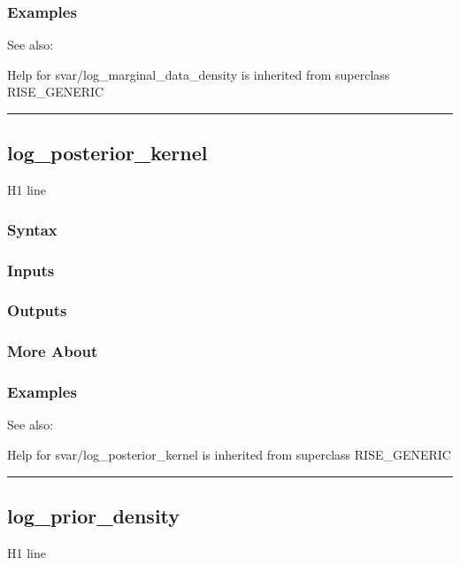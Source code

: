 \documentclass[letterpaper,10pt,english]{sphinxmanual}
\begin{document}
\subsubsection{Examples}
\label{classes/models/@svar/svar:id51}
See also:

Help for svar/log\_marginal\_data\_density is inherited from superclass RISE\_GENERIC


\bigskip\hrule{}\bigskip



\subsection{log\_posterior\_kernel}
\label{classes/models/@svar/svar:log-posterior-kernel}\label{classes/models/@svar/svar:id52}
H1 line


\subsubsection{Syntax}
\label{classes/models/@svar/svar:id53}

\subsubsection{Inputs}
\label{classes/models/@svar/svar:id54}

\subsubsection{Outputs}
\label{classes/models/@svar/svar:id55}

\subsubsection{More About}
\label{classes/models/@svar/svar:id56}

\subsubsection{Examples}
\label{classes/models/@svar/svar:id57}
See also:

Help for svar/log\_posterior\_kernel is inherited from superclass RISE\_GENERIC


\bigskip\hrule{}\bigskip



\subsection{log\_prior\_density}
\label{classes/models/@svar/svar:id58}\label{classes/models/@svar/svar:log-prior-density}
H1 line
\end{document}
